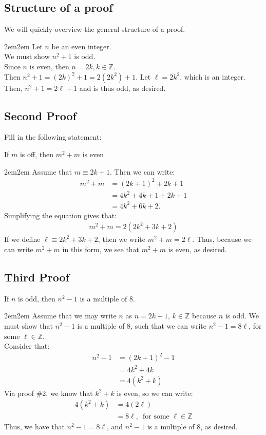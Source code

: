 \documentclass[10pt,oneside]{book}
\newcommand{\Z}{\mathbb{Z}}\newcommand{\R}{\mathbb{R}}\newcommand{\N}{\mathbb{N}}
\newcommand{\en}{\vspace{0.25cm}\\}
\newcommand{\centerit}[1]{{\begin{center} #1 \end{center}}}
\let\endoldproof\endproof
\renewenvironment{proof}[1][\proofname]
  {\vspace{0.2cm}\begin{adjustwidth}{2em}{2em}
   \oldproof[#1]}
  {\endoldproof
   \end{adjustwidth}}
\begin{document}
\subsection{Structure of a proof}
We will quickly overview the general structure of a proof.
\begin{proof}
    Let $n$ be an even integer.\\
    We must show $n^2+1$ is odd. \\
    Since $n$ is even, then $n = 2k, k\in \Z$.\\
    Then $n^2 + 1 = (2k)^2 + 1 = 2(2k^2) + 1$. Let $\ell = 2k^2$, which is an integer. \\
    Then, $n^2 + 1 = 2\ell +1$ and is thus odd, as desired. 
\end{proof}
\subsection{Second Proof}
Fill in the following statement:
\centerit{If $m$ is off, then $m^2 +m $ is even}
\begin{proof}
Assume that $m \equiv 2k + 1$. Then we can write:
\begin{align*}
    m^2+m &= (2k + 1)^2 + 2k + 1\\
    &= 4k^2 + 4k + 1 + 2k +1\\
    &= 4k^2 + 6k + 2.
\end{align*}
Simplifying the equation gives that:
\begin{align*}
    m^2 + m = 2(2k^2 + 3k + 2)
\end{align*}
If we define $\ell \equiv 2k^2 + 3k + 2$, then we write $m^2 + m = 2\ell$. Thus, because we can write $m^2 +m$ in this form, we see that $m^2+m$ is even, as desired. 
\end{proof}
\subsection{Third Proof}
If $n$ is odd, then $n^2 - 1$ is a multiple of 8.
\begin{proof}
    Assume that we may write $n$ as $n = 2k+1, \,k\in \Z$ because $n$ is odd. We must show that $n^2 - 1$ is a multiple of 8, such that we can write $n^2- 1 = 8\ell$, for some $\ell \in \Z$. \en
    Consider that:
    \begin{align*}
        n^2 - 1 &= (2k +1)^2 -1\\
        &= 4k^2 + 4k\\
        &= 4(k^2 + k)
    \end{align*}
    Via proof \#2, we know that $k^2 + k$ is even, so we can write:
    \begin{align*}
        4(k^2+k) &= 4(2\ell)\\
        &= 8\ell, \,\text{ for some } \ell \in \Z
    \end{align*}
    Thus, we have that $n^2 - 1 = 8\ell$, and $n^2 - 1$ is a multiple of 8, as desired.
\end{proof}
\end{document}
